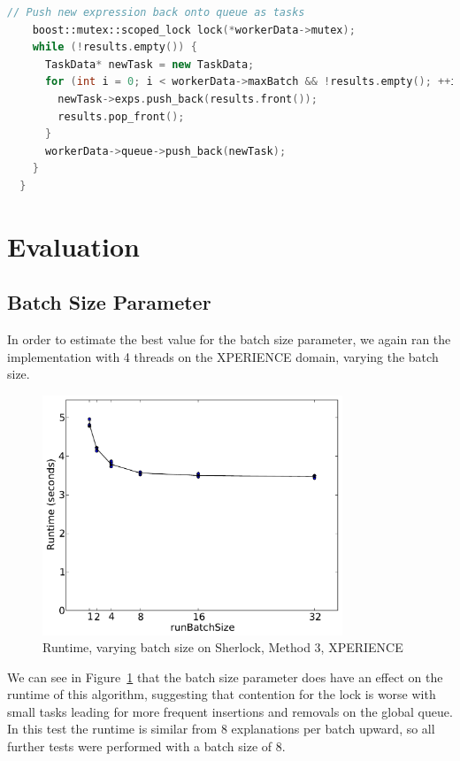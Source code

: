 \documentclass[12pt,twoside,abbrevs,msc,ai,notimes,logo,sansheadings]{infthesis}
\begin{document}
\begin{lstlisting}[language=C++]
    // Push new expression back onto queue as tasks
    boost::mutex::scoped_lock lock(*workerData->mutex);
    while (!results.empty()) {
      TaskData* newTask = new TaskData;
      for (int i = 0; i < workerData->maxBatch && !results.empty(); ++i) {
        newTask->exps.push_back(results.front());
        results.pop_front();
      }
      workerData->queue->push_back(newTask);
    }
  }
  \end{lstlisting}

  
  \section{Evaluation}
  
  \subsection{Batch Size Parameter}
  
  In order to estimate the best value for the batch size parameter, we again ran the implementation with 4 threads on the XPERIENCE domain, varying the batch size.
  
  \begin{figure}[!htbp]
  \begin{centering}
  \includegraphics[width=0.8\textwidth]{images/batch-xper5-sherlock-4-1}
  \par\end{centering}
  \caption{Runtime, varying batch size on Sherlock, Method 3, XPERIENCE}
  \label{fig:batch-4}
  \end{figure}
  
  We can see in Figure~\ref{fig:batch-4} that the batch size parameter does have an effect on the runtime of this algorithm, suggesting that contention for the lock is worse with small tasks leading for more frequent insertions and removals on the global queue. In this test the runtime is similar from 8 explanations per batch upward, so all further tests were performed with a batch size of 8.
  
\end{document}
